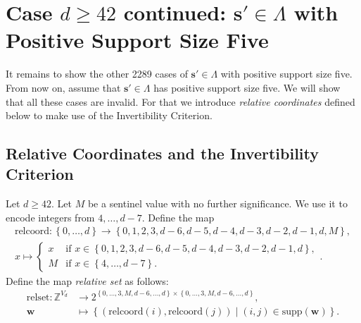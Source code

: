 \section{Case \( d \geq 42\) continued: \( \mathbf{s}' \in \Lambda\) with Positive Support Size Five}

It remains to show the other 2289 cases of \( \mathbf{s}' \in \Lambda \) with positive support size five. From now on, assume that \( \mathbf{s}' \in \Lambda \) has positive support size five. We will show that all these cases are invalid. For that we introduce \emph{relative coordinates} defined below to make use of the Invertibility Criterion.

\subsection{Relative Coordinates and the Invertibility Criterion}

\begin{definition}
    Let \( d \geq 42 \).
    Let \( M \) be a sentinel value with no further significance. We use it to encode integers from \( 4, \dots, d-7 \). Define the map 
    \begin{align*}
        \mathrm{relcoord}: \left\{ 0, \dots, d \right\} \to \left\{ 0,1,2,3,d-6,d-5,d-4,d-3,d-2,d-1,d,M \right\}, \\
        x \mapsto \begin{cases}
            x & \text{if } x \in \left\{ 0,1,2,3, d-6,d-5,d-4,d-3,d-2,d-1,d \right\}, \\
            M& \text{if } x \in \left\{ 4, \dots, d-7 \right\}.
        \end{cases}.
    \end{align*}
    Define the map \emph{relative set} as follows:
    \begin{align*}
        \mathrm{relset}: \mathbb{Z}^{V_d} &\to 2^{\left\{ 0, \dots, 3, M, d-6, \dots, d \right\} \times \left\{ 0, \dots, 3, M, d-6, \dots, d \right\}}, \\
        \mathbf{w} &\mapsto \left\{ (\mathrm{relcoord}(i), \mathrm{relcoord}(j)) \mid (i,j) \in \mathrm{supp}(\mathbf{w}) \right\}.
    \end{align*}
\end{definition}

